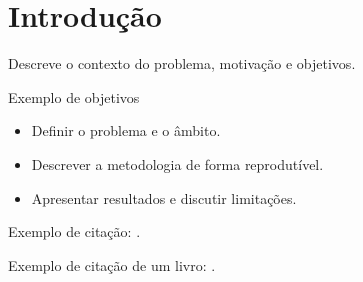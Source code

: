 \section{Introdução}
\label{sec:introduction}

Descreve o contexto do problema, motivação e objetivos.

\begin{exampleblock}{Exemplo de objetivos}
\begin{itemize}
  \item Definir o problema e o âmbito.
  \item Descrever a metodologia de forma reprodutível.
  \item Apresentar resultados e discutir limitações.
\end{itemize}
\end{exampleblock}

Exemplo de citação: \citep{example2020}.

Exemplo de citação de um livro: \citep{laotzu1963}.
